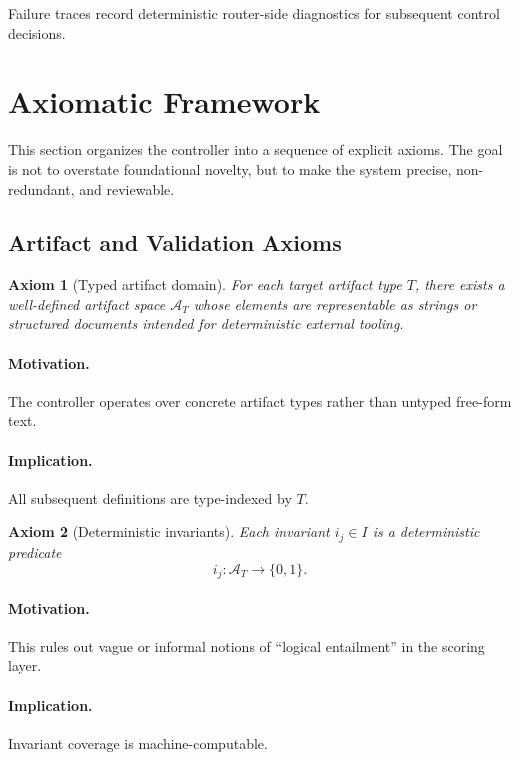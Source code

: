 \documentclass[11pt,a4paper]{article}
\numberwithin{equation}{section}
\newtheorem{axiom}{Axiom}[section]
\theoremstyle{definition}
\newcommand{\Artifacts}{\mathcal{A}}
\begin{document}
Failure traces record deterministic router-side diagnostics for subsequent control decisions.

\section{Axiomatic Framework}

This section organizes the controller into a sequence of explicit axioms. The goal is not to overstate foundational novelty, but to make the system precise, non-redundant, and reviewable.

\subsection{Artifact and Validation Axioms}

\begin{axiom}[Typed artifact domain]
For each target artifact type \(T\), there exists a well-defined artifact space \(\Artifacts_T\) whose elements are representable as strings or structured documents intended for deterministic external tooling.
\end{axiom}

\paragraph{Motivation.}
The controller operates over concrete artifact types rather than untyped free-form text.

\paragraph{Implication.}
All subsequent definitions are type-indexed by \(T\).

\begin{axiom}[Deterministic invariants]
Each invariant \(i_j\in I\) is a deterministic predicate
\[
i_j : \Artifacts_T \to \{0,1\}.
\]
\end{axiom}

\paragraph{Motivation.}
This rules out vague or informal notions of ``logical entailment'' in the scoring layer.

\paragraph{Implication.}
Invariant coverage is machine-computable.
\end{document}
